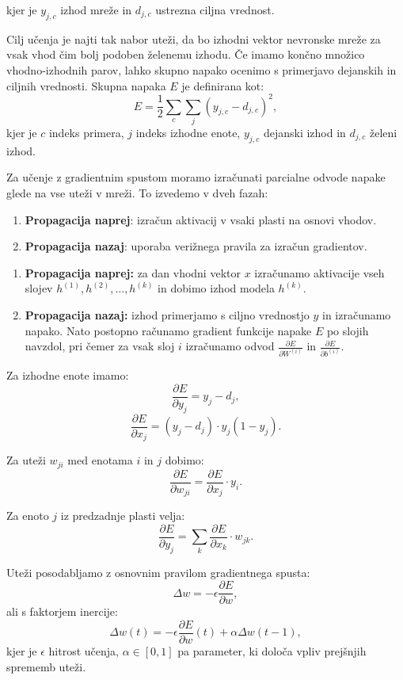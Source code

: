 kjer je \( y_{j,c} \) izhod mreže in \( d_{j,c} \) ustrezna ciljna vrednost.


Cilj učenja je najti tak nabor uteži, da bo izhodni vektor nevronske mreže za vsak vhod čim bolj podoben želenemu izhodu. Če imamo končno množico vhodno-izhodnih parov, lahko skupno napako ocenimo s primerjavo dejanskih in ciljnih vrednosti. Skupna napaka \( E \) je definirana kot:
\[
E = \frac{1}{2} \sum_c \sum_j (y_{j,c} - d_{j,c})^2,
\]
kjer je \( c \) indeks primera, \( j \) indeks izhodne enote, \( y_{j,c} \) dejanski izhod in \( d_{j,c} \) želeni izhod.

Za učenje z gradientnim spustom moramo izračunati parcialne odvode napake glede na vse uteži v mreži. To izvedemo v dveh fazah:
\begin{enumerate}
  \item \textbf{Propagacija naprej}: izračun aktivacij v vsaki plasti na osnovi vhodov.
  \item \textbf{Propagacija nazaj}: uporaba verižnega pravila za izračun gradientov.
\end{enumerate}

\begin{enumerate}
  \item \textbf{Propagacija naprej:} za dan vhodni vektor $x$ izračunamo aktivacije vseh slojev $h^{(1)}, h^{(2)}, \dots, h^{(k)}$ in dobimo izhod modela $h^{(k)}$.
  \item \textbf{Propagacija nazaj:} izhod primerjamo s ciljno vrednostjo $y$ in izračunamo napako. Nato postopno računamo gradient funkcije napake $E$ po slojih navzdol, pri čemer za vsak sloj $i$ izračunamo odvod $\frac{\partial E}{\partial W^{(i)}}$ in $\frac{\partial E}{\partial b^{(i)}}$.
\end{enumerate}

Za izhodne enote imamo:
\[
\frac{\partial E}{\partial y_j} = y_j - d_j,
\]
\[
\frac{\partial E}{\partial x_j} = (y_j - d_j) \cdot y_j (1 - y_j).
\]

Za uteži \( w_{ji} \) med enotama \( i \) in \( j \) dobimo:
\[
\frac{\partial E}{\partial w_{ji}} = \frac{\partial E}{\partial x_j} \cdot y_i.
\]

Za enoto \( j \) iz predzadnje plasti velja:
\[
\frac{\partial E}{\partial y_j} = \sum_k \frac{\partial E}{\partial x_k} \cdot w_{jk}.
\]

Uteži posodabljamo z osnovnim pravilom gradientnega spusta:
\[
\Delta w = -\epsilon \frac{\partial E}{\partial w},
\]
ali s faktorjem inercije:
\[
\Delta w(t) = -\epsilon \frac{\partial E}{\partial w}(t) + \alpha \Delta w(t-1),
\]
kjer je \( \epsilon \) hitrost učenja, \( \alpha \in [0,1] \) pa parameter, ki določa vpliv prejšnjih sprememb uteži.

